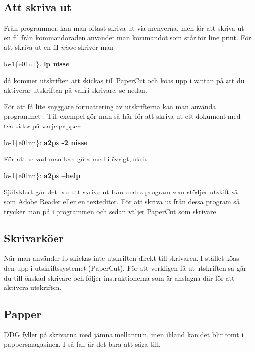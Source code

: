 \documentclass[a4paper,twocolumn]{book}
\begin{document}
\subsection{Att skriva ut}

Från programmen kan man oftast skriva ut via menyerna, men för att skriva ut
en fil från kommandoraden använder man kommandot  som står
för line print. För att skriva ut en fil \emph{nisse} skriver man
\begin{example}
  lo-1\{e01nn\}: \textbf{lp nisse}
\end{example}
då kommer utskriften att skickas till PaperCut och köas upp i väntan på att du aktiverar utskriften på valfri skrivare, se nedan.

För att få lite snyggare formattering av utskrifterna kan man använda
programmet . Till exempel gör man så här för att skriva ut ett
dokument med två sidor på varje papper:
\begin{example}
  lo-1\{e01nn\}: \textbf{a2ps -2 nisse}
\end{example}
För att se vad man kan göra med  i övrigt, skriv
\begin{example}
  lo-1\{e01nn\}: \textbf{a2ps --help}
\end{example}

Självklart går det bra att skriva ut från andra program som stödjer utskift
så som Adobe Reader eller en texteditor. För att skriva ut från dessa program
så trycker man på  i programmen och sedan väljer PaperCut som skrivare.

\subsection{Skrivarköer}

När man använder lp skickas inte utskriften direkt
till skrivaren. I stället köas den upp i utskriftssystemet (PaperCut). För att verkligen få ut utskriften så går du till önskad skrivare och följer instruktionerna som är anslagna där för att aktivera utskriften.

\subsection{Papper}

 DDG fyller på skrivarna med jämna mellanrum, men ibland
kan det blir tomt i pappersmagasinen. I så fall är det bara att säga till.
\end{document}
